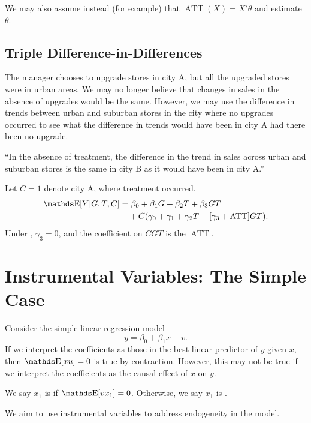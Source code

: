 \documentclass[letterpaper, 10pt]{article}
\DeclareMathOperator{\ATT}{ATT}
\begin{document}
We may also assume instead (for example) that \(\ATT(X) = X' \theta\) and estimate \(\theta\).


\subsection{Triple Difference-in-Differences}
\begin{example}
  The manager chooses to upgrade stores in city A, but all the upgraded stores were in urban areas.
  We may no longer believe that changes in sales in the absence of upgrades would be the same.
  However, we may use the difference in trends between urban and suburban stores in the city where no upgrades occurred to see what the difference in trends would have been in city A had there been no upgrade.
\end{example}
\begin{assumption}\label{as:DiD-triple}
  ``In the absence of treatment, the difference in the trend in sales across urban and suburban stores is the same in city B as it would have been in city A.''
\end{assumption}

Let \(C = 1\) denote city A, where treatment occurred.
\begin{align*}
  \E[Y|G, T, C]
  &= \beta_0 + \beta_1 G + \beta_2 T + \beta_3 GT \\
  &\quad + C(\gamma_0 + \gamma_1 + \gamma_2 T + [\gamma_3 + \ATT] GT).
\end{align*}
Under , \(\gamma_3 = 0\), and the coefficient on \(CGT\) is the \(\ATT\).


\section{Instrumental Variables: The Simple Case}
Consider the simple linear regression model
\[
  y = \beta_0 + \beta_1 x + v.
\]
If we interpret the coefficients as those in the best linear predictor of \(y\) given \(x\), then \(\E[xu] = 0\) is true by contraction.
However, this may not be true if we interpret the coefficients as the causal effect of \(x\) on \(y\).

\begin{definition}
  We say \(x_1\) is  if \(\E[vx_1] = 0\).
  Otherwise, we say \(x_1\) is .
\end{definition}

We aim to use instrumental variables to address endogeneity in the model.
\end{document}
